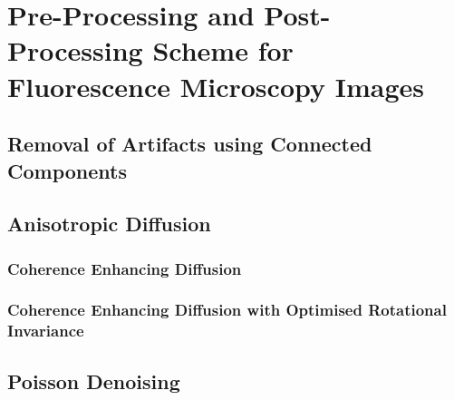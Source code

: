 
\chapter{Pre-Processing and Post-Processing Scheme for Fluorescence Microscopy Images} %

\label{chap:Chapter7} %


\section{Removal of Artifacts using Connected Components}



\section{Anisotropic Diffusion}


\subsection{Coherence Enhancing Diffusion}



\subsection{Coherence Enhancing Diffusion with Optimised Rotational Invariance}



\section{Poisson Denoising}



